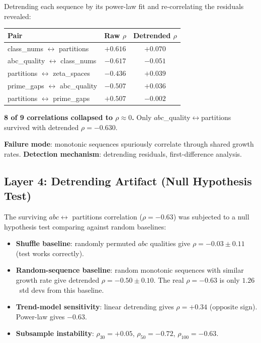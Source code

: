 \documentclass[11pt,a4paper]{article}
\begin{document}
Detrending each sequence by its power-law fit and re-correlating the
residuals revealed:

\begin{center}
\begin{tabular}{lcc}
  \toprule
  Pair & Raw $\rho$ & Detrended $\rho$ \\
  \midrule
  class\_nums $\leftrightarrow$ partitions & $+0.616$ & $+0.070$ \\
  abc\_quality $\leftrightarrow$ class\_nums & $-0.617$ & $-0.051$ \\
  partitions $\leftrightarrow$ zeta\_spaces & $-0.436$ & $+0.039$ \\
  prime\_gaps $\leftrightarrow$ abc\_quality & $-0.507$ & $+0.036$ \\
  partitions $\leftrightarrow$ prime\_gaps & $+0.507$ & $-0.002$ \\
  \bottomrule
\end{tabular}
\end{center}

\textbf{8 of 9 correlations collapsed to $\rho \approx 0$.} Only
$abc$\_quality$\leftrightarrow$partitions survived with detrended
$\rho = -0.630$.

\textbf{Failure mode}: monotonic sequences spuriously correlate through
shared growth rates.
\textbf{Detection mechanism}: detrending residuals, first-difference
analysis.

\subsection{Layer 4: Detrending Artifact (Null Hypothesis Test)}

The surviving $abc \leftrightarrow$ partitions correlation ($\rho =
-0.63$) was subjected to a null hypothesis test comparing against
random baselines:

\begin{itemize}
  \item \textbf{Shuffle baseline}: randomly permuted $abc$ qualities
    give $\rho = -0.03 \pm 0.11$ (test works correctly).
  \item \textbf{Random-sequence baseline}: random monotonic sequences
    with similar growth rate give detrended $\rho = -0.50 \pm 0.10$.
    The real $\rho = -0.63$ is only $1.26$~std devs from this baseline.
  \item \textbf{Trend-model sensitivity}: linear detrending gives
    $\rho = +0.34$ (opposite sign). Power-law gives $-0.63$.
  \item \textbf{Subsample instability}: $\rho_{30} = +0.05$,
    $\rho_{50} = -0.72$, $\rho_{100} = -0.63$.
\end{itemize}
\end{document}
